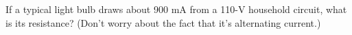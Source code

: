         If a typical light bulb draws about 900 mA from a 110-V
        household circuit, what is its resistance?  (Don't worry
        about the fact that it's alternating current.)
        \answercheck
